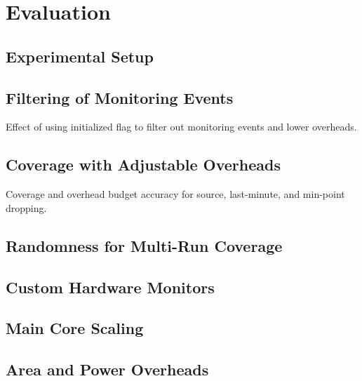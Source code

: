 \section{Evaluation}
\label{sec:evaluation}

\subsection{Experimental Setup}

\subsection{Filtering of Monitoring Events}

Effect of using initialized flag to filter out monitoring events and lower overheads.

\subsection{Coverage with Adjustable Overheads}
Coverage and overhead budget accuracy for source, last-minute, and min-point dropping.

\subsection{Randomness for Multi-Run Coverage}

\subsection{Custom Hardware Monitors}

\subsection{Main Core Scaling}

\subsection{Area and Power Overheads}


